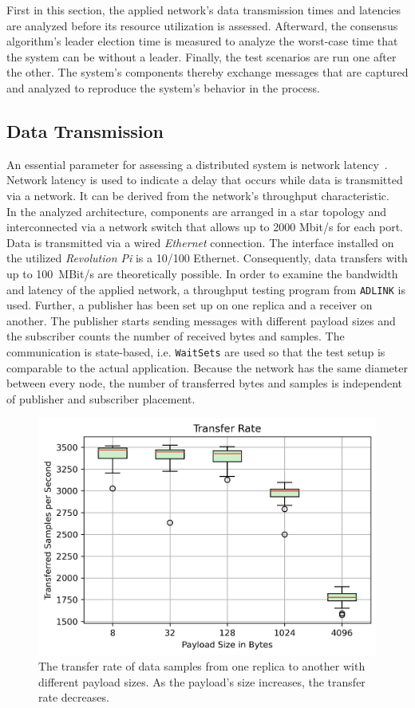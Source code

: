 First in this section, the applied network's data transmission times and latencies are analyzed before its resource utilization is assessed.
Afterward, the consensus algorithm's leader election time is measured to analyze the worst-case time that the system can be without a leader.
Finally, the test scenarios are run one after the other.
The system's components thereby exchange messages that are captured and analyzed to reproduce the system's behavior in the process.

\subsection{Data Transmission}

An essential parameter for assessing a distributed system is network latency~\cite{SinhaMeasureNetworkLatency}.
Network latency is used to indicate a delay that occurs while data is transmitted via a network.
It can be derived from the network's throughput characteristic.
\\

In the analyzed architecture, components are arranged in a star topology and interconnected via a network switch that allows up to 2000 Mbit/s for each port.
Data is transmitted via a wired \textit{Ethernet} connection.
The interface installed on the utilized \textit{Revolution Pi} is a 10/100 Ethernet.
Consequently, data transfers with up to 100~MBit/s are theoretically possible.
In order to examine the bandwidth and latency of the applied network, a  throughput testing program from \texttt{ADLINK} is used.
Further, a publisher has been set up on one replica and a receiver on another.
The publisher starts sending messages with different payload sizes and the subscriber counts the number of received bytes and samples.
The communication is state-based, i.e. \texttt{WaitSets} are used so that the test setup is comparable to the actual application.
Because the network has the same diameter between every node, the number of transferred bytes and samples is independent of publisher and subscriber placement.

\begin{figure}[!hbt]
	\centering
	\includegraphics[width=0.8\linewidth]{images/plots/transferRate}
	\caption{The transfer rate of data samples from one replica to another with different payload sizes. As the payload's size increases, the transfer rate decreases.}
	\label{fig:PlotTransferRate}
\end{figure}

